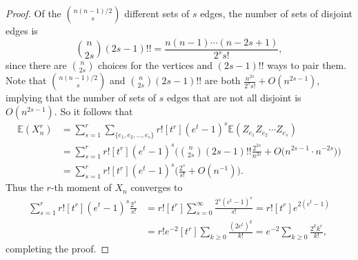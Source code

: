 \documentclass[10pt,a4paper]{amsart}
\newcommand{\Ex}{\mathbb{E}}
\begin{document}
\begin{proof}
Of the $\binom{n(n-1)/2}{s}$ different sets of $s$ edges, the number of sets of disjoint edges is
\[\binom{n}{2s} (2s-1)!! = \frac{n(n-1)\cdots (n-2s+1)}{2^s s!},\]
since there are $\binom{n}{2s}$ choices for the vertices and $(2s-1)!!$ ways to pair them. Note that $\binom{n(n-1)/2}{s}$ and $\binom{n}{2s} (2s-1)!!$ are both $\frac{n^{2s}}{2^s s!} + O(n^{2s-1})$, implying that the number of sets of $s$ edges that are not all disjoint is $O(n^{2s-1})$. So it follows that
\begin{align*}
\Ex(X_n^r) &= \sum_{s=1}^r \sum_{\{e_1,e_2,\ldots,e_s\}} r! [t^r] (e^t-1)^s \Ex(Z_{e_1}Z_{e_2}\cdots Z_{e_s}) \\
&= \sum_{s=1}^r r! [t^r] (e^t-1)^s \Big( \binom{n}{2s} (2s-1)!! \frac{2^{2s}}{n^{2s}} + O \Big( n^{2s-1} \cdot n^{-2s} \Big) \Big) \\
&= \sum_{s=1}^r r! [t^r] (e^t-1)^s \Big( \frac{2^s}{s!} + O(n^{-1}) \Big).
\end{align*}
Thus the $r$-th moment of $X_n$ converges to
\begin{align*}
\sum_{s=1}^r r! [t^r] (e^t-1)^s \frac{2^s}{s!} &= r! [t^r] \sum_{s = 0}^{\infty} \frac{2^s (e^t-1)^s}{s!} = r! [t^r] e^{2(e^t-1)} \\
&= r! e^{-2} [t^r] \sum_{k \geq 0} \frac{(2e^t)^k}{k!} = e^{-2} \sum_{k \geq 0} \frac{2^k k^r}{k!},
\end{align*}
completing the proof.
\end{proof}
\end{document}
